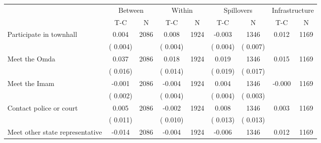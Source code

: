 
\begin{tabular}{l*{8}{c}}\hline&\multicolumn{2}{c}{Between}&\multicolumn{2}{c}{Within}&\multicolumn{2}{c}{Spillovers}&\multicolumn{2}{c}{Infrastructure}\\ \cmidrule(r){2-3}\cmidrule(l){4-5}\cmidrule(l){6-7}\cmidrule(l){8-9} & {T-C} & {N} & {T-C} & {N}  & {T-C}  & {N} & {T-C}  & {N} \\ \midrule
Participate in townhall        &              0.004      &       2086       &              0.008      &       1924       &             -0.003      &       1346  &        0.012 &       1169       \\
                       &       (       0.004)            &                               &       (       0.004)            &                               &       (       0.004)            &       (       0.007) &                  \\
Meet the Omda        &              0.037      &       2086       &              0.018      &       1924       &              0.019      &       1346  &        0.015 &       1169       \\
                       &       (       0.016)            &                               &       (       0.014)            &                               &       (       0.019)            &       (       0.017) &                  \\
Meet the Imam        &             -0.001      &       2086       &             -0.004      &       1924       &              0.004      &       1346  &       -0.000 &       1169       \\
                       &       (       0.002)            &                               &       (       0.004)            &                               &       (       0.004)            &       (       0.003) &                  \\
Contact police or court        &              0.005      &       2086       &             -0.002      &       1924       &              0.008      &       1346  &        0.003 &       1169       \\
                       &       (       0.011)            &                               &       (       0.010)            &                               &       (       0.013)            &       (       0.013) &                  \\
Meet other state representative        &             -0.014      &       2086       &             -0.004      &       1924       &             -0.006      &       1346  &        0.012 &       1169       \\

\end{tabular}

